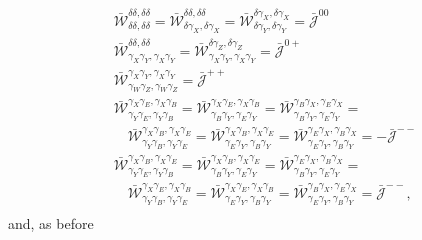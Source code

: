 \documentclass[a4paper,11pt]{article}
\begin{document}
        \begin{align}
          &\bar{\mathcal{W}}^{\delta  \delta  ,\delta  \delta  }_{\delta  \delta  ,\delta  \delta  }=
           \bar{\mathcal{W}}^{\delta  \delta  ,\delta  \delta  }_{\delta  \gamma_X,\delta  \gamma_X}=
           \bar{\mathcal{W}}^{\delta  \gamma_X,\delta  \gamma_X}_{\delta  \gamma_Y,\delta  \gamma_Y}=\bar{\mathcal{J}}^{00}\\
          &\bar{\mathcal{W}}^{\delta  \delta  ,\delta  \delta  }_{\gamma_X\gamma_Y,\gamma_X\gamma_Y}=
           \bar{\mathcal{W}}^{\delta  \gamma_Z,\delta  \gamma_Z}_{\gamma_X\gamma_Y,\gamma_X\gamma_Y}=\bar{\mathcal{J}}^{0+}\\
          &\bar{\mathcal{W}}^{\gamma_X\gamma_Y,\gamma_X\gamma_Y}_{\gamma_W\gamma_Z,\gamma_W\gamma_Z}=\bar{\mathcal{J}}^{++}\\
          &\bar{\mathcal{W}}^{\gamma_X\gamma_E,\gamma_X\gamma_B}_{\gamma_Y\gamma_E,\gamma_Y\gamma_B}=
           \bar{\mathcal{W}}^{\gamma_X\gamma_E,\gamma_X\gamma_B}_{\gamma_B\gamma_Y,\gamma_E\gamma_Y}=
           \bar{\mathcal{W}}^{\gamma_B\gamma_X,\gamma_E\gamma_X}_{\gamma_B\gamma_Y,\gamma_E\gamma_Y}=\\
          &\hspace{12pt}
           \bar{\mathcal{W}}^{\gamma_X\gamma_B,\gamma_X\gamma_E}_{\gamma_Y\gamma_B,\gamma_Y\gamma_E}=
           \bar{\mathcal{W}}^{\gamma_X\gamma_B,\gamma_X\gamma_E}_{\gamma_E\gamma_Y,\gamma_B\gamma_Y}=
           \bar{\mathcal{W}}^{\gamma_E\gamma_X,\gamma_B\gamma_X}_{\gamma_E\gamma_Y,\gamma_B\gamma_Y}=-\bar{\mathcal{J}}^{--}\\
          &\bar{\mathcal{W}}^{\gamma_X\gamma_B,\gamma_X\gamma_E}_{\gamma_Y\gamma_E,\gamma_Y\gamma_B}=
           \bar{\mathcal{W}}^{\gamma_X\gamma_B,\gamma_X\gamma_E}_{\gamma_B\gamma_Y,\gamma_E\gamma_Y}=
           \bar{\mathcal{W}}^{\gamma_E\gamma_X,\gamma_B\gamma_X}_{\gamma_B\gamma_Y,\gamma_E\gamma_Y}=\\
          &\hspace{12pt}
           \bar{\mathcal{W}}^{\gamma_X\gamma_E,\gamma_X\gamma_B}_{\gamma_Y\gamma_B,\gamma_Y\gamma_E}=
           \bar{\mathcal{W}}^{\gamma_X\gamma_E,\gamma_X\gamma_B}_{\gamma_E\gamma_Y,\gamma_B\gamma_Y}=
           \bar{\mathcal{W}}^{\gamma_B\gamma_X,\gamma_E\gamma_X}_{\gamma_E\gamma_Y,\gamma_B\gamma_Y}=\bar{\mathcal{J}}^{--},\\
        \end{align}
        and, as before
\end{document}
